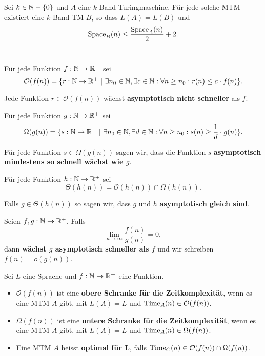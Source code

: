 \begin{lemma}
Sei \(k \in \mathbb{N} - \{0\}\) und \(A\) eine \(k\)-Band-Turingmaschine. Für jede solche MTM existiert eine \(k\)-Band-TM \(B\), so dass \(L(A) = L(B)\) und
\[
\operatorname{Space}_B(n) \leq \frac{\operatorname{Space}_A(n)}{2} + 2.
\]\\
\end{lemma}

\begin{definition}
Für jede Funktion \(f: \mathbb{N} \to \mathbb{R}^+\) sei
\[
\mathcal{O}(f(n)) = \{ r: \N \to \R^+ \ |\ \exists n_0 \in \N, \exists c \in \N: \forall n \geq n_0: r(n) \leq c \cdot f(n)\}.
\]

Jede Funktion \(r \in \mathcal{O}(f(n))\) wächst \textbf{asymptotisch nicht schneller} als \(f\).\\
\end{definition}

\begin{definition}
Für jede Funktion \(g: \mathbb{N} \to \mathbb{R}^+\) sei
\[
\Omega(g(n)) = \{ s: \N \to \R^+ \ |\ \exists n_0 \in \N, \exists d \in \N: \forall n \geq n_0: s(n) \geq \frac{1}{d} \cdot g(n) \}.
\]

Für jede Funktion \(s \in \Omega(g(n))\) sagen wir, dass die Funktion \(s\) \textbf{asymptotisch mindestens so schnell wächst wie \(g\)}.\\
\end{definition}

\begin{definition}
Für jede Funktion \(h: \mathbb{N} \to \mathbb{R}^+\) sei
\[
\Theta(h(n)) = \mathcal{O}(h(n)) \cap \Omega(h(n)).
\]

Falls \(g \in \Theta(h(n))\) so sagen wir, dass \(g\) und \(h\) \textbf{asymptotisch gleich sind}.\\
\end{definition}

\begin{definition}
Seien \(f, g: \mathbb{N} \to \mathbb{R}^+\). Falls
\[
\lim_{n \to \infty} \frac{f(n)}{g(n)} = 0,
\]
dann \textbf{wächst \(g\) asymptotisch schneller als \(f\)} und wir schreiben \(f(n) = o(g(n))\).\\
\end{definition}

\begin{definition}
Sei \(L\) eine Sprache und \(f: \mathbb{N} \to \mathbb{R}^+\) eine Funktion.
\begin{itemize}
  \item \(\mathcal{O}(f(n))\) ist eine \textbf{obere Schranke für die Zeitkomplexität}, wenn es eine MTM \(A\) gibt, mit \(L(A) = L\) und \(\operatorname{Time}_A(n) \in \mathcal{O}(f(n))\).
  \item \(\Omega(f(n))\) ist eine \textbf{untere Schranke für die Zeitkomplexität}, wenn es eine MTM \(A\) gibt, mit \(L(A) = L\) und \(\operatorname{Time}_A(n) \in \Omega(f(n))\).
  \item Eine MTM \(A\) heisst \textbf{optimal für L}, falls \(\operatorname{Time}_C(n) \in \mathcal{O}(f(n)) \cap \Omega(f(n))\).\\
\end{itemize}
\end{definition}

